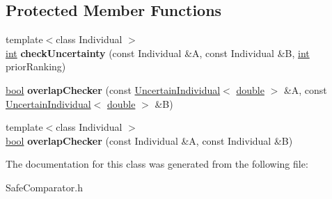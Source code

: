 \subsection*{Protected Member Functions}
\begin{DoxyCompactItemize}
\item 
{\footnotesize template$<$class Individual $>$ }\\\hyperlink{classint}{int} {\bfseries check\+Uncertainty} (const Individual \&A, const Individual \&B, \hyperlink{classint}{int} prior\+Ranking)\hypertarget{classSafeComparator_a00a34d96c74ac6bfa118d70fba8a9b33}{}\label{classSafeComparator_a00a34d96c74ac6bfa118d70fba8a9b33}

\item 
\hyperlink{classbool}{bool} {\bfseries overlap\+Checker} (const \hyperlink{classUncertainIndividual}{Uncertain\+Individual}$<$ \hyperlink{classdouble}{double} $>$ \&A, const \hyperlink{classUncertainIndividual}{Uncertain\+Individual}$<$ \hyperlink{classdouble}{double} $>$ \&B)\hypertarget{classSafeComparator_a18c91f15fd5e12d4244ee2e3ddefe81c}{}\label{classSafeComparator_a18c91f15fd5e12d4244ee2e3ddefe81c}

\item 
{\footnotesize template$<$class Individual $>$ }\\\hyperlink{classbool}{bool} {\bfseries overlap\+Checker} (const Individual \&A, const Individual \&B)\hypertarget{classSafeComparator_a20f59bafabda3ffcf7c86d53c623500e}{}\label{classSafeComparator_a20f59bafabda3ffcf7c86d53c623500e}

\end{DoxyCompactItemize}


The documentation for this class was generated from the following file\+:\begin{DoxyCompactItemize}
\item 
Safe\+Comparator.\+h\end{DoxyCompactItemize}
